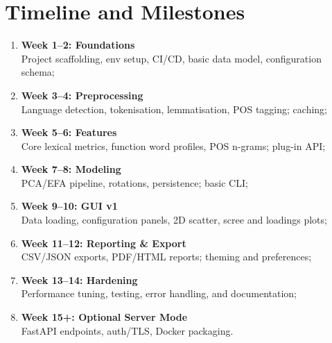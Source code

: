 \section{Timeline and Milestones}
\begin{enumerate}
    \item \textbf{Week 1--2: Foundations} \\
          Project scaffolding, env setup, CI/CD, basic data model, configuration schema;
    \item \textbf{Week 3--4: Preprocessing} \\
          Language detection, tokenisation, lemmatisation, POS tagging; caching;
    \item \textbf{Week 5--6: Features} \\
          Core lexical metrics, function word profiles, POS n-grams; plug-in API;
    \item \textbf{Week 7--8: Modeling} \\
          PCA/EFA pipeline, rotations, persistence; basic CLI;
    \item \textbf{Week 9--10: GUI v1} \\
          Data loading, configuration panels, 2D scatter, scree and loadings plots;
    \item \textbf{Week 11--12: Reporting \& Export} \\
          CSV/JSON exports, PDF/HTML reports; theming and preferences;
    \item \textbf{Week 13--14: Hardening} \\
          Performance tuning, testing, error handling, and documentation;
    \item \textbf{Week 15+: Optional Server Mode} \\
          FastAPI endpoints, auth/TLS, Docker packaging.
\end{enumerate}
